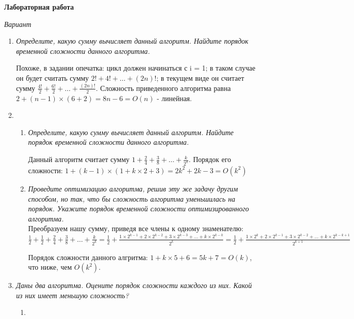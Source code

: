\documentclass[a4paper,12pt]{report}
\DeclareRobustCommand{\clist}[1]
{
  
}
\begin{document}
\begin{center}
{\large \bf Лабораторная работа }

{\it Вариант }
\end{center}
\begin{enumerate}[leftmargin = 10pt]
  \item {\it Определите, какую сумму вычисляет данный алгоритм. Найдите 
        порядок временной сложности данного алгоритма.}
    \clist{4_1.pas}
    Похоже, в задании опечатка: цикл должен начинаться с i = 1; в таком случае
    он будет считать сумму $2! + 4! + \dots + (2n)!$; в текущем виде он 
    считает сумму $\frac{4!}{2} + \frac{6!}{2} + \dots + \frac{(2n)!}{2}$. 
    Сложность приведенного алгоритма равна $2 + (n-1)\times(6 + 2) = 8n - 6 = 
    O(n)$ - линейная.
  \item 
    \begin{enumerate}
      \item {\it Определите, какую сумму вычисляет данный алгоритм. Найдите 
            порядок временной сложности данного алгоритма.}
        \clist{4_2-1.pas}
        Данный алгоритм считает сумму $1 + \frac{2}{4} + \frac{3}{8} + \dots
        + \frac{k}{2^k}$. Порядок его сложности: $1 + (k-1)\times(1 + k\times2
        + 3) = 2k^2 + 2k - 3 = O(k^2)$
      \item {\it Проведите оптимизацию алгоритма, решив эту же задачу другим
            способом, но так, что бы сложность алгоритма уменьшилась на 
            порядок. Укажите порядок временной сложности оптимизированного
            алгоритма.} \\
            Преобразуем нашу сумму, приведя все члены к одному знаменателю:
            $\frac{1}{2} + \frac{1}{2} + \frac{2}{4} + \frac{3}{8} + \dots +
            \frac{k}{2^k} = \frac{1}{2} + \frac{1\times2^{k-1} + 
            2\times2^{k-2} + 3\times2^{k-3} + \dots + k\times2^{k-k}}{2^k} =
            \frac{1}{2} + \frac{1\times2^{k} + 
            2\times2^{k-1} + 3\times2^{k-2} + \dots +
            k\times2^{k-k+1}}{2^{k+1}}$
            \clist{4_2-2.pas}
            Порядок сложности данного алгритма: $1 + k\times5 + 6 = 5k + 7 =
            O(k)$, что ниже, чем $O(k^2)$.
    \end{enumerate}
  \item {\it Даны два алгоритма. Оцените порядок сложности каждого из них.
        Какой из них имеет меньшую сложность?}\\
    \begin{enumerate}
      \item

\end{enumerate}
\end{enumerate}
\end{document}
